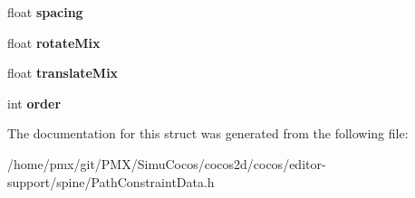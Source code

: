 \begin{DoxyCompactItemize}
$$float {\bfseries spacing}
\item 
\mbox{\label{structspPathConstraintData_a83c009d3c6d5819dcbd0524a8d0421c5}} 
float {\bfseries rotate\+Mix}
\item 
\mbox{\label{structspPathConstraintData_ac14e42a949cab150cd5a573b4216f299}} 
float {\bfseries translate\+Mix}
\item 
\mbox{\label{structspPathConstraintData_ad324576259eeb251c9c9457f2594e328}} 
int {\bfseries order}
\end{DoxyCompactItemize}


The documentation for this struct was generated from the following file\+:\begin{DoxyCompactItemize}
\item 
/home/pmx/git/\+P\+M\+X/\+Simu\+Cocos/cocos2d/cocos/editor-\/support/spine/Path\+Constraint\+Data.\+h\end{DoxyCompactItemize}
